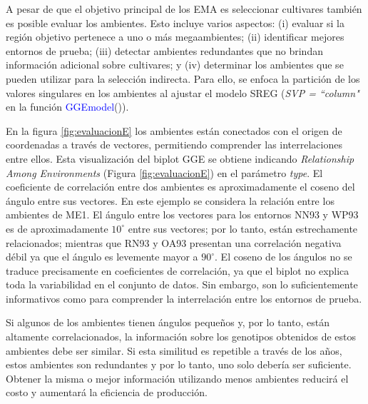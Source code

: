 A pesar de que el objetivo principal de los EMA es seleccionar cultivares también es posible evaluar los ambientes. Esto incluye varios aspectos: (i) evaluar si la región objetivo pertenece a uno o más megaambientes; (ii) identificar mejores entornos de prueba; (iii) detectar ambientes redundantes que no brindan información adicional sobre cultivares; y (iv) determinar los ambientes que se pueden utilizar para la selección indirecta. Para ello, se enfoca la partición de los valores singulares en los ambientes al ajustar el modelo SREG (\emph{SVP = ``column"} en la función \textcolor{blue}{GGEmodel}()). 

En la figura \ref{fig:evaluacionE} los ambientes están conectados con el origen de coordenadas a través de vectores, permitiendo comprender las interrelaciones entre ellos.  Esta visualización del biplot GGE se obtiene indicando \emph{Relationship Among Environments} (Figura \ref{fig:evaluacionE}) en el parámetro \emph{type}. El coeficiente de correlación entre dos ambientes es aproximadamente el coseno del ángulo entre sus vectores. 
En este ejemplo se considera la relación entre los ambientes de ME1. El ángulo entre los vectores para los entornos NN93 y WP93 es de aproximadamente $10^{\circ}$ entre sus vectores; por lo tanto, están estrechamente relacionados; mientras que RN93 y OA93 presentan una correlación negativa débil ya que el ángulo es levemente mayor a $90^{\circ}$. El coseno de los ángulos no se traduce precisamente en coeficientes de correlación, ya que el biplot no explica toda la variabilidad en el conjunto de datos. Sin embargo, son lo suficientemente informativos como para comprender la interrelación entre los entornos de prueba. 

Si algunos de los ambientes tienen ángulos pequeños y, por lo tanto, están altamente correlacionados, la información sobre los genotipos obtenidos de estos ambientes debe ser similar. Si esta similitud es repetible a través de los años, estos ambientes son redundantes y por lo tanto, uno solo debería ser suficiente. Obtener la misma o mejor información utilizando menos ambientes reducirá el costo y aumentará la eficiencia de producción.


